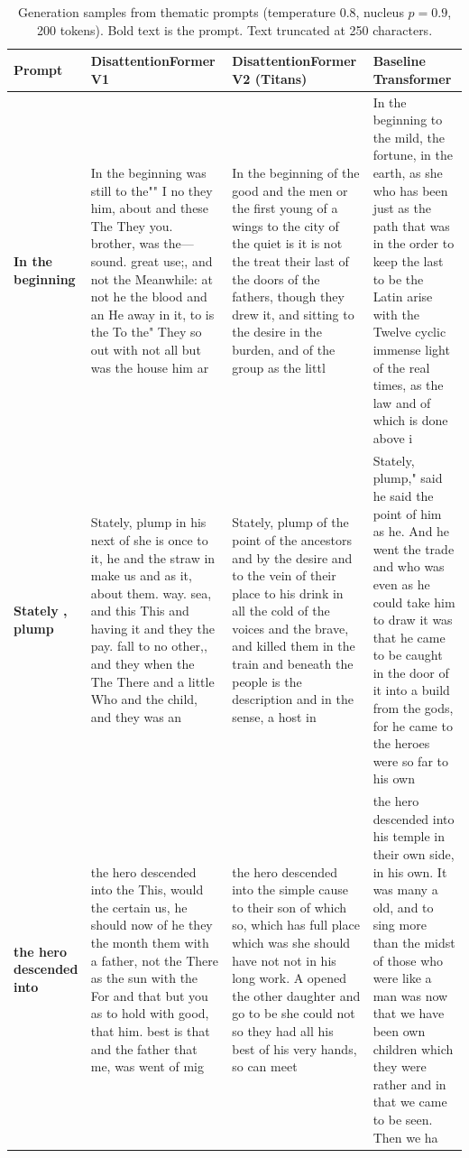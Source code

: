\begin{table}[t]
\centering
\caption{Generation samples from thematic prompts (temperature 0.8, nucleus $p=0.9$, 200 tokens).
Bold text is the prompt. Text truncated at 250 characters.}
\label{tab:samples}
\small
\begin{tabular}{p{2cm}p{4.3cm}p{4.3cm}p{4.3cm}}
\toprule
\textbf{Prompt} & \textbf{DisattentionFormer V1} & \textbf{DisattentionFormer V2 (Titans)} & \textbf{Baseline Transformer} \\
\midrule
\textbf{In the beginning} & In the beginning was still to the"" I no they him, about and these The They you. brother, was the— sound. great use;, and not the Meanwhile: at not he the blood and an He away in it, to is the To the" They so out with not all but was the house him ar & In the beginning of the good and the men or the first young of a wings to the city of the quiet is it is not the treat their last of the doors of the fathers, though they drew it, and sitting to the desire in the burden, and of the group as the littl & In the beginning to the mild, the fortune, in the earth, as she who has been just as the path that was in the order to keep the last to be the Latin arise with the Twelve cyclic immense light of the real times, as the law and of which is done above i \\
\midrule
\textbf{Stately , plump} & Stately, plump in his next of she is once to it, he and the straw in make us and as it, about them. way. sea, and this This and having it and they the pay. fall to no other,, and they when the The There and a little Who and the child, and they was an & Stately, plump of the point of the ancestors and by the desire and to the vein of their place to his drink in all the cold of the voices and the brave, and killed them in the train and beneath the people is the description and in the sense, a host in & Stately, plump," said he said the point of him as he. And he went the trade and who was even as he could take him to draw it was that he came to be caught in the door of it into a build from the gods, for he came to the heroes were so far to his own  \\
\midrule
\textbf{the hero descended into} & the hero descended into the This, would the certain us, he should now of he they the month them with a father, not the There as the sun with the For and that but you as to hold with good, that him. best is that and the father that me, was went of mig & the hero descended into the simple cause to their son of which so, which has full place which was she should have not not in his long work. A opened the other daughter and go to be she could not so they had all his best of his very hands, so can meet & the hero descended into his temple in their own side, in his own. It was many a old, and to sing more than the midst of those who were like a man was now that we have been own children which they were rather and in that we came to be seen. Then we ha \\

\end{tabular}
\end{table}
